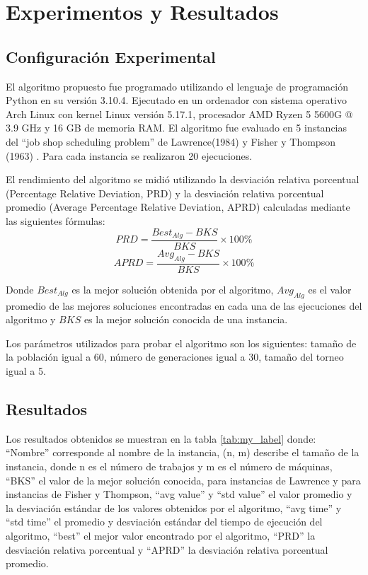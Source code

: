 \documentclass[12pt,a4paper]{article}
\begin{document}
\section{Experimentos y Resultados}
\subsection{Configuración Experimental}
    El algoritmo propuesto fue programado utilizando el lenguaje de programación Python en su versión 3.10.4. Ejecutado en un ordenador con sistema operativo Arch Linux con kernel Linux versión 5.17.1, procesador AMD Ryzen 5 5600G @ 3.9 GHz y 16 GB de memoria RAM. El algoritmo fue evaluado en 5 instancias del ``job shop scheduling problem'' de Lawrence(1984) \cite{la} y Fisher y Thompson (1963) \cite{ft}. Para cada instancia se realizaron 20 ejecuciones.
    
    El rendimiento del algoritmo se midió utilizando la desviación relativa porcentual (Percentage Relative Deviation, PRD) y la desviación relativa porcentual promedio (Average Percentage Relative Deviation, APRD) calculadas mediante las siguientes fórmulas:
    \begin{equation}
        PRD = {\frac{Best_{Alg} - BKS}{BKS}} \times 100\%
    \end{equation}
    \begin{equation}
        APRD = {\frac{Avg_{Alg} - BKS}{BKS}} \times 100\%
    \end{equation}
    
    Donde ${Best_{Alg}}$ es la mejor solución obtenida por el algoritmo, ${Avg_{Alg}}$ es el valor promedio de las mejores soluciones encontradas en cada una de las ejecuciones del algoritmo y $BKS$ es la mejor solución conocida de una instancia.
    
    Los parámetros utilizados para probar el algoritmo son los siguientes: tamaño de la población igual a 60, número de generaciones igual a 30, tamaño del torneo igual a 5.
    
\subsection{Resultados}
    Los resultados obtenidos se muestran en la tabla \ref{tab:my_label} donde: ``Nombre'' corresponde al nombre de la instancia, (n, m) describe el tamaño de la instancia, donde n es el número de trabajos y m es el número de máquinas, ``BKS'' el valor de la mejor solución conocida, \cite{bksla40} para instancias de Lawrence y \cite{bksft06} para instancias de Fisher y Thompson, ``avg value'' y ``std value'' el valor promedio y la desviación estándar de los valores obtenidos por el algoritmo, ``avg time'' y ``std time'' el promedio y desviación estándar del tiempo de ejecución del algoritmo, ``best'' el mejor valor encontrado por el algoritmo, ``PRD'' la desviación relativa porcentual y ``APRD'' la desviación relativa porcentual promedio.
\end{document}
